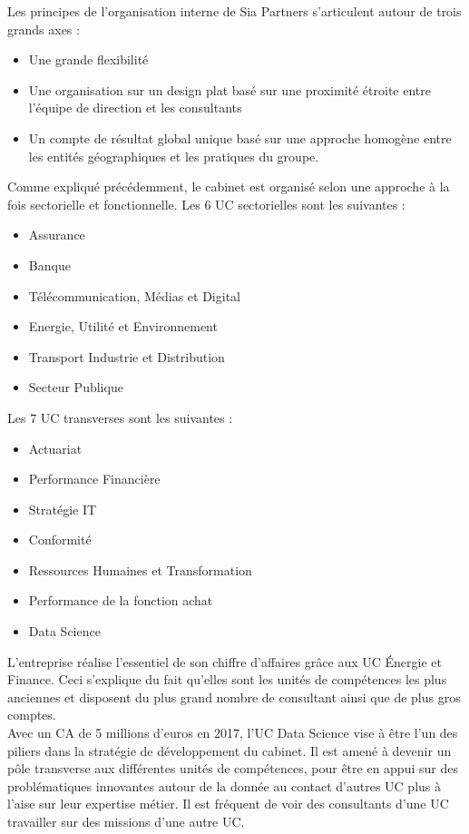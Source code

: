 \documentclass{article} %
\begin{document}
Les principes de l'organisation interne de Sia Partners s'articulent autour de trois grands axes : 
\begin{itemize}
 \item Une grande flexibilité
 \item Une organisation sur un design plat basé sur une proximité étroite entre l’équipe de direction et les consultants
 \item Un compte de résultat global unique basé sur une approche homogène entre les entités géographiques et les pratiques du groupe.
\end{itemize}
Comme expliqué précédemment, le cabinet est organisé selon une approche à la fois sectorielle et fonctionnelle. Les 6 UC sectorielles sont les suivantes :  
\begin{itemize}
 \item Assurance
 \item Banque
 \item Télécommunication, Médias et Digital
 \item Energie, Utilité et Environnement
 \item Transport Industrie et Distribution
 \item Secteur Publique
\end{itemize}
Les 7 UC transverses sont les suivantes : 
\begin{itemize}
 \item Actuariat
 \item Performance Financière
 \item Stratégie IT
 \item Conformité
 \item Ressources Humaines et Transformation
 \item Performance de la fonction achat
 \item Data Science
\end{itemize}
L’entreprise réalise l’essentiel de son chiffre d’affaires grâce aux UC Énergie et Finance. Ceci s’explique du fait qu’elles sont les unités de compétences les plus anciennes et disposent du plus grand nombre de consultant ainsi que de plus gros comptes. \\

Avec un CA de 5 millions d’euros en 2017, l’UC Data Science vise à être l’un des piliers dans la stratégie de développement du cabinet. Il est amené à devenir un pôle transverse aux différentes unités de compétences, pour être en appui sur des problématiques innovantes autour de la donnée au contact d’autres UC plus à l’aise sur leur expertise métier. Il est fréquent de voir des consultants d’une UC travailler sur des missions d’une autre UC. \\
\end{document}
